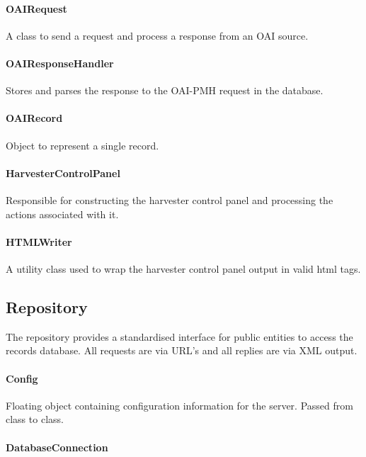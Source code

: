 \documentclass[a4paper,11pt]{article}
\begin{document}
\paragraph{OAIRequest}

A class to send a request and process a response from an OAI source.

\paragraph{OAIResponseHandler}

Stores and parses the response to the OAI-PMH request in the database.

\paragraph{OAIRecord}

Object to represent a single record.

\paragraph{HarvesterControlPanel}

Responsible for constructing the harvester control panel and processing the actions associated with it.

\paragraph{HTMLWriter}

A utility class used to wrap the harvester control panel output in valid html tags.

\subsection{Repository}
\label{sec:class_summaries:repository}

The repository provides a standardised interface for public entities to access the records database. All requests are via URL's and all replies are via XML output.

\paragraph{Config}

Floating object containing configuration information for the server. Passed from class to class.

\paragraph{DatabaseConnection}
\end{document}
